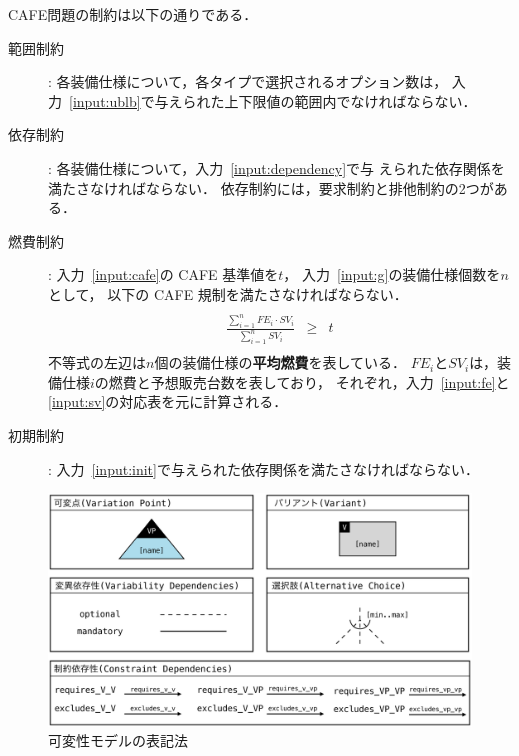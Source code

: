 CAFE問題の制約は以下の通りである．
\begin{description}
\item[範囲制約]: 各装備仕様について，各タイプで選択されるオプション数は，
  入力~\ref{input:ublb}で与えられた上下限値の範囲内でなければならない．
\item[依存制約]: 各装備仕様について，入力~\ref{input:dependency}で与
  えられた依存関係を満たさなければならない．
  依存制約には，要求制約と排他制約の2つがある．
\item[燃費制約]: 入力~\ref{input:cafe}の CAFE 基準値を$t$，
  入力~\ref{input:g}の装備仕様個数を$n$として，
  以下の CAFE 規制を満たさなければならない．
  \[
    \begin{array}{lcr}
      & & \\
      \displaystyle\frac{\sum_{i=1}^{n} FE_{i}\cdot SV_{i}}{\sum_{i=1}^{n} SV_{i}}
      &
        \geq 
      &
        t \\
      & & 
    \end{array}
  \]
  不等式の左辺は$n$個の装備仕様の\textbf{平均燃費}を表している．
  $FE_{i}$と$SV_{i}$は，装備仕様$i$の燃費と予想販売台数を表しており，
  それぞれ，入力~\ref{input:fe}と\ref{input:sv}の対応表を元に計算される．
\item[初期制約]:
  入力~\ref{input:init}で与えられた依存関係を満たさなければならない．
\end{description}

\begin{figure}[tb]
  \centering
  \includegraphics[width=\linewidth]{images/notation.eps}
  \caption{可変性モデルの表記法\cite{Pohl05:sple}}
  \label{fig:ovm_notation}
\end{figure}

